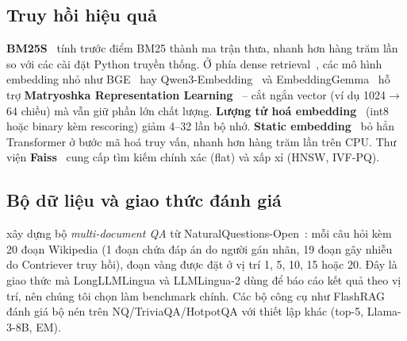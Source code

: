 \subsection{Truy hồi hiệu quả}

\textbf{BM25S}~\cite{lu2024bm25s} tính trước điểm BM25 thành ma trận thưa, nhanh hơn hàng trăm lần so
với các cài đặt Python truyền thống. Ở phía dense retrieval~\cite{karpukhin2020dpr}, các mô hình embedding nhỏ như BGE~\cite{xiao2024cpack} hay Qwen3-Embedding~\cite{zhang2025qwen3emb} và
EmbeddingGemma~\cite{vera2025embeddinggemma} hỗ trợ \textbf{Matryoshka Representation
Learning}~\cite{kusupati2022matryoshka} -- cắt ngắn vector (ví dụ 1024$\to$64 chiều) mà vẫn giữ phần
lớn chất lượng. \textbf{Lượng tử hoá embedding}~\cite{hfquant2024} (int8 hoặc binary kèm
rescoring) giảm 4--32 lần bộ nhớ. \textbf{Static embedding}~\cite{hfstatic2025} bỏ hẳn Transformer ở
bước mã hoá truy vấn, nhanh hơn hàng trăm lần trên CPU. Thư viện \textbf{Faiss}~\cite{douze2024faiss}
cung cấp tìm kiếm chính xác (flat) và xấp xỉ (HNSW, IVF-PQ).

\subsection{Bộ dữ liệu và giao thức đánh giá}

\citet{liu2024lost} xây dựng bộ \emph{multi-document QA} từ NaturalQuestions-Open~\cite{kwiatkowski2019nq}:
mỗi câu hỏi kèm 20 đoạn Wikipedia (1 đoạn chứa đáp án do người gán nhãn, 19 đoạn gây nhiễu do
Contriever truy hồi), đoạn vàng được đặt ở vị trí 1, 5, 10, 15 hoặc 20. Đây là giao thức mà
LongLLMLingua và LLMLingua-2 dùng để báo cáo kết quả theo vị trí, nên chúng tôi chọn làm benchmark
chính. Các bộ công cụ như FlashRAG~\cite{jin2025flashrag} đánh giá bộ nén trên NQ/TriviaQA/HotpotQA với
thiết lập khác (top-5, Llama-3-8B, EM).

